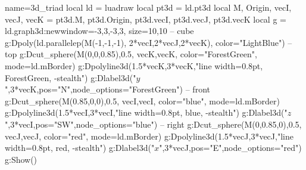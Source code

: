 \documentclass[border=5pt]{standalone}%
\begin{document}
\begin{luadraw}{name=3d_triad}
local ld = luadraw
local pt3d = ld.pt3d
local M, Origin, vecI, vecJ, vecK = pt3d.M, pt3d.Origin, pt3d.vecI, pt3d.vecJ, pt3d.vecK
local g = ld.graph3d:new{window={-3,3,-3,3}, size={10,10}}
-- cube
g:Dpoly(ld.parallelep(M(-1,-1,-1), 2*vecI,2*vecJ,2*vecK), {color="LightBlue"})
-- top
g:Dcut_sphere(M(0,0,0.85),0.5, {vecK,vecK}, {color="ForestGreen", mode=ld.mBorder})
g:Dpolyline3d({1.5*vecK,3*vecK},"line width=0.8pt, ForestGreen, -stealth")
g:Dlabel3d("$y$",3*vecK,{pos="N",node_options="ForestGreen"})
-- front
g:Dcut_sphere(M(0.85,0,0),0.5, {vecI,vecI}, {color="blue", mode=ld.mBorder})
g:Dpolyline3d({1.5*vecI,3*vecI},"line width=0.8pt, blue, -stealth")
g:Dlabel3d("$z$",3*vecI,{pos="SW",node_options="blue"})
-- right
g:Dcut_sphere(M(0,0.85,0),0.5, {vecJ,vecJ}, {color="red", mode=ld.mBorder})
g:Dpolyline3d({1.5*vecJ,3*vecJ},"line width=0.8pt, red, -stealth") 
g:Dlabel3d("$x$",3*vecJ,{pos="E",node_options="red"})
g:Show()
\end{luadraw}
\end{document}
